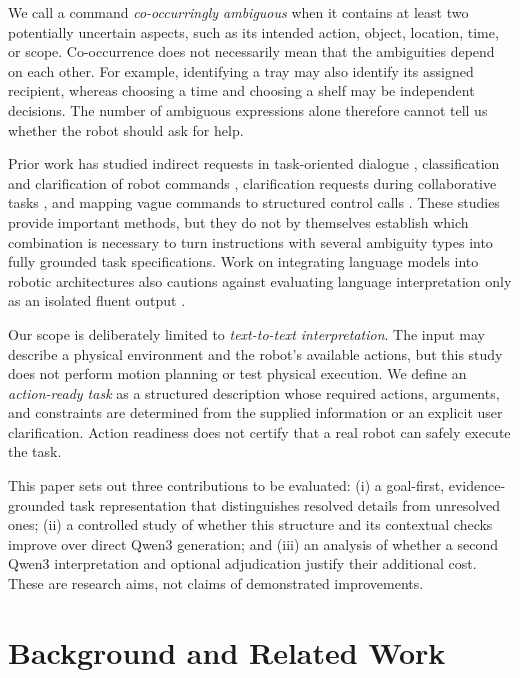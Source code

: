 \documentclass[10pt,conference]{IEEEtran}
\begin{document}
We call a command \emph{co-occurringly ambiguous} when it contains at least two potentially uncertain aspects, such as its intended action, object, location, time, or scope. Co-occurrence does not necessarily mean that the ambiguities depend on each other. For example, identifying a tray may also identify its assigned recipient, whereas choosing a time and choosing a shelf may be independent decisions. The number of ambiguous expressions alone therefore cannot tell us whether the robot should ask for help.

Prior work has studied indirect requests in task-oriented dialogue \cite{mannekote}, classification and clarification of robot commands \cite{clara}, clarification requests during collaborative tasks \cite{codraw}, and mapping vague commands to structured control calls \cite{clarifyvc}. These studies provide important methods, but they do not by themselves establish which combination is necessary to turn instructions with several ambiguity types into fully grounded task specifications. Work on integrating language models into robotic architectures also cautions against evaluating language interpretation only as an isolated fluent output \cite{sarathy}.

Our scope is deliberately limited to \emph{text-to-text interpretation}. The input may describe a physical environment and the robot's available actions, but this study does not perform motion planning or test physical execution. We define an \emph{action-ready task} as a structured description whose required actions, arguments, and constraints are determined from the supplied information or an explicit user clarification. Action readiness does not certify that a real robot can safely execute the task.

This paper sets out three contributions to be evaluated: (i) a goal-first, evidence-grounded task representation that distinguishes resolved details from unresolved ones; (ii) a controlled study of whether this structure and its contextual checks improve over direct Qwen3 generation; and (iii) an analysis of whether a second Qwen3 interpretation and optional adjudication justify their additional cost. These are research aims, not claims of demonstrated improvements.

\section{Background and Related Work}
\end{document}

